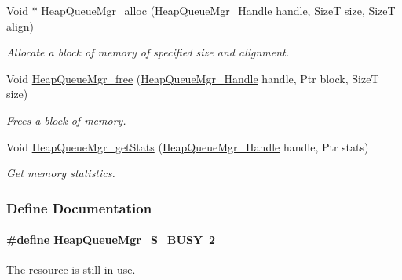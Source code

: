 \begin{DoxyCompactItemize}
Void $\ast$ \hyperlink{_heap_queue_mgr_8h_a5fe6ffb8e88a0b62a51039af8290bea5}{HeapQueueMgr\_\-alloc} (\hyperlink{_heap_queue_mgr_8h_a2ef82b5fb989b7b4bfddf91e742e65a8}{HeapQueueMgr\_\-Handle} handle, SizeT size, SizeT align)
\begin{DoxyCompactList}\small\item\em Allocate a block of memory of specified size and alignment. \item\end{DoxyCompactList}\item 
Void \hyperlink{_heap_queue_mgr_8h_ac3c19816640b1de59f5fbc791fbaf41b}{HeapQueueMgr\_\-free} (\hyperlink{_heap_queue_mgr_8h_a2ef82b5fb989b7b4bfddf91e742e65a8}{HeapQueueMgr\_\-Handle} handle, Ptr block, SizeT size)
\begin{DoxyCompactList}\small\item\em Frees a block of memory. \item\end{DoxyCompactList}\item 
Void \hyperlink{_heap_queue_mgr_8h_a5d9144c993be46318b73d76055a68d9f}{HeapQueueMgr\_\-getStats} (\hyperlink{_heap_queue_mgr_8h_a2ef82b5fb989b7b4bfddf91e742e65a8}{HeapQueueMgr\_\-Handle} handle, Ptr stats)
\begin{DoxyCompactList}\small\item\em Get memory statistics. \item\end{DoxyCompactList}\end{DoxyCompactItemize}


\subsubsection{Define Documentation}
\paragraph[{HeapQueueMgr\_\-S\_\-BUSY}]{\setlength{\rightskip}{0pt plus 5cm}\#define HeapQueueMgr\_\-S\_\-BUSY~2}\hfill\label{_heap_queue_mgr_8h_a8c8548b774b12881b04ad5605794fe74}


The resource is still in use. 

